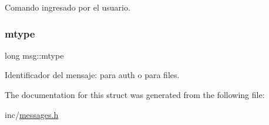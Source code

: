 Comando ingresado por el usuario. 

\mbox{\label{structmsg_accdc8131bcf1ef1bcd7df1b337aee50f}} 
\subsubsection{\texorpdfstring{mtype}{mtype}}
{\footnotesize\ttfamily long msg\+::mtype}



Identificador del mensaje\+: para auth o para files. 



The documentation for this struct was generated from the following file\+:\begin{DoxyCompactItemize}
\item 
inc/\hyperlink{messages_8h}{messages.\+h}\end{DoxyCompactItemize}
